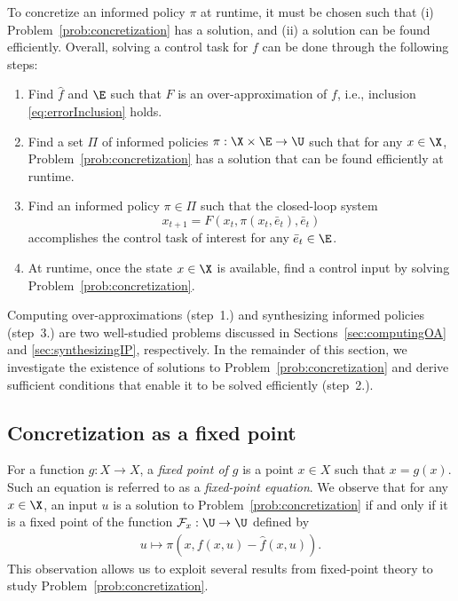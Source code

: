 \documentclass[letterpaper, 10 pt, conference]{ieeeconf}  %
\begin{document}
To concretize an informed policy $\pi$ at runtime, it must be chosen such that (i) Problem~\ref{prob:concretization} has a solution, and (ii) a solution can be found efficiently. Overall, solving a control task for $f$ can be done through the following steps:
\begin{enumerate}[1.]
\item Find $\hat{f}$ and $\E$ such that $F$ is an over-approximation of $f$, i.e., inclusion \eqref{eq:errorInclusion} holds. \label{item:overapprox}
\item Find a set $\Pi$ of informed policies $\pi:\X\times\E\rightarrow\U$ such that for any $x\in\X$, Problem~\ref{prob:concretization} has a solution that can be found efficiently at runtime.


\item Find an informed policy $\pi\in\Pi$ such that the closed-loop system
$$
x_{t+1}=F(x_t,\pi(x_t,\bar{e}_t),\bar{e}_t)
$$
accomplishes the control task of interest for any $\bar{e}_t\in\E$.
\item At runtime, once the state $x\in\X$ is available, find a control input by solving Problem~\ref{prob:concretization}.
\end{enumerate}
Computing over-approximations (step~1.) and synthesizing informed policies (step~3.) are two well-studied problems discussed in Sections~\ref{sec:computingOA} and \ref{sec:synthesizingIP}, respectively. In the remainder of this section, we investigate the existence of solutions to Problem~\ref{prob:concretization} and derive sufficient conditions that enable it to be solved efficiently (step~2.).

\subsection{Concretization as a fixed point}\label{sec:IPconcretization}
For a function $g:X\rightarrow X$, a \emph{fixed point of $g$} is a point $x\in X$ such that $x=g(x)$. Such an equation is referred to as a \emph{fixed-point equation}. We observe that for any $x\in\X$, an input $u$ is a solution to Problem~\ref{prob:concretization} if and only if it is a fixed point of the function $\mathcal{F}_x:\U\rightarrow\U$ defined by
\begin{align}\label{eq:FPoperator}
u\mapsto \pi(x,f(x,u)-\hat{f}(x,u)).
\end{align}
This observation allows us to exploit several results from fixed-point theory to study Problem~\ref{prob:concretization}.
\end{document}
